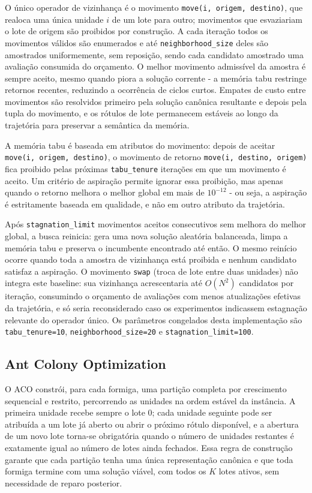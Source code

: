 \documentclass[12pt,a4paper]{article}
\begin{document}
O único operador de vizinhança é o movimento \texttt{move(i, origem,
destino)}, que realoca uma única unidade $i$ de um lote para outro;
movimentos que esvaziariam o lote de origem são proibidos por construção. A
cada iteração todos os movimentos válidos são enumerados e até
\texttt{neighborhood\_size} deles são amostrados uniformemente, sem
reposição, sendo cada candidato amostrado uma avaliação consumida do
orçamento. O melhor movimento admissível da amostra é sempre aceito, mesmo
quando piora a solução corrente - a memória tabu restringe retornos recentes,
reduzindo a ocorrência de ciclos curtos. Empates de custo entre movimentos são
resolvidos primeiro pela solução canônica resultante e depois pela tupla do
movimento, e os rótulos de lote permanecem estáveis ao longo da trajetória
para preservar a semântica da memória.

A memória tabu é baseada em atributos do movimento: depois de aceitar
\texttt{move(i, origem, destino)}, o movimento de retorno \texttt{move(i,
destino, origem)} fica proibido pelas próximas \texttt{tabu\_tenure}
iterações em que um movimento é aceito. Um critério de aspiração permite
ignorar essa proibição, mas apenas quando o retorno melhora o melhor global
em mais de $10^{-12}$ - ou seja, a aspiração é estritamente baseada em
qualidade, e não em outro atributo da trajetória.

Após \texttt{stagnation\_limit} movimentos aceitos consecutivos sem melhora
do melhor global, a busca reinicia: gera uma nova solução aleatória
balanceada, limpa a memória tabu e preserva o incumbente encontrado até
então. O mesmo reinício ocorre quando toda a amostra de vizinhança está
proibida e nenhum candidato satisfaz a aspiração. O movimento \texttt{swap}
(troca de lote entre duas unidades) não integra este baseline: sua
vizinhança acrescentaria até $O(N^2)$ candidatos por iteração, consumindo o
orçamento de avaliações com menos atualizações efetivas da trajetória, e só
seria reconsiderado caso os experimentos indicassem estagnação relevante do
operador único. Os parâmetros congelados desta implementação são
\texttt{tabu\_tenure=10}, \texttt{neighborhood\_size=20} e
\texttt{stagnation\_limit=100}.

\subsection{Ant Colony Optimization}
\label{subsec:aco}

O ACO \cite{dorigo1996} constrói, para cada formiga, uma partição completa
por crescimento sequencial e restrito, percorrendo as unidades na ordem
estável da instância. A primeira unidade recebe sempre o lote $0$; cada
unidade seguinte pode ser atribuída a um lote já aberto ou abrir o próximo
rótulo disponível, e a abertura de um novo lote torna-se obrigatória quando
o número de unidades restantes é exatamente igual ao número de lotes ainda
fechados. Essa regra de construção garante que cada partição tenha uma única
representação canônica e que toda formiga termine com uma solução viável,
com todos os $K$ lotes ativos, sem necessidade de reparo posterior.
\end{document}
